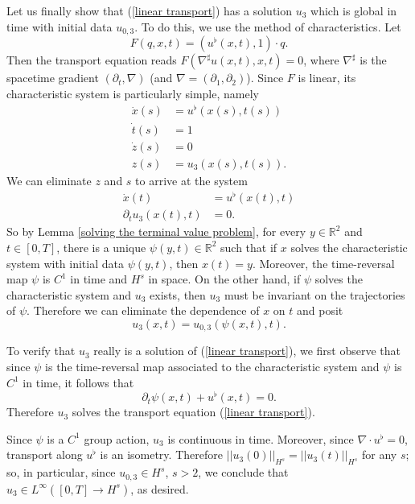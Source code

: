 \documentclass[10pt]{article}
\newcommand{\RR}{\mathbb{R}}
\theoremstyle{definition}
\begin{document}
Let us finally show that (\ref{linear transport}) has a solution $u_3$ which is global in time with initial data $u_{0,3}$.
To do this, we use the method of characteristics. Let
$$F(q, x, t) = (u^\flat(x, t), 1) \cdot q.$$
Then the transport equation reads $F(\nabla^\sharp u(x, t), x, t) = 0$, where $\nabla^\sharp$ is the spacetime gradient $(\partial_t, \nabla)$ (and $\nabla = (\partial_1, \partial_2)$).
Since $F$ is linear, its characteristic system is particularly simple, namely
\begin{align*}
\dot x(s) &= u^\flat(x(s), t(s))\\
\dot t(s) &= 1\\
\dot z(s) &= 0\\
z(s) &= u_3(x(s), t(s)).
\end{align*}
We can eliminate $z$ and $s$ to arrive at the system
\begin{align*}
\dot x(t) &= u^\flat(x(t), t)\\
\partial_t u_3(x(t), t) &= 0.
\end{align*}
So by Lemma \ref{solving the terminal value problem}, for every $y \in \RR^2$ and $t \in [0, T]$, there is a unique $\psi(y, t) \in \RR^2$ such that if $x$ solves the characteristic system with initial data $\psi(y, t)$, then $x(t) = y$.
Moreover, the time-reversal map $\psi$ is $C^1$ in time and $H^s$ in space.
On the other hand, if $\psi$ solves the characteristic system and $u_3$ exists, then $u_3$ must be invariant on the trajectories of $\psi$.
Therefore we can eliminate the dependence of $x$ on $t$ and posit
$$u_3(x, t) = u_{0,3}(\psi(x, t), t).$$

To verify that $u_3$ really is a solution of (\ref{linear transport}), we first observe that since $\psi$ is the time-reversal map associated to the characteristic system and $\psi$ is $C^1$ in time, it follows that
$$\partial_t \psi(x, t) + u^\flat(x, t) = 0.$$
Therefore $u_3$ solves the transport equation (\ref{linear transport}).

Since $\psi$ is a $C^1$ group action, $u_3$ is continuous in time.
Moreover, since $\nabla \cdot u^\flat = 0$, transport along $u^\flat$ is an isometry.
Therefore $||u_3(0)||_{H^s} = ||u_3(t)||_{H^s}$ for any $s$; so, in particular, since $u_{0,3} \in H^s$, $s > 2$, we conclude that $u_3 \in L^\infty([0, T] \to H^s)$, as desired.
\end{document}
